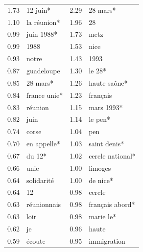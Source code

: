 \documentclass{article}
\begin{document}
\begin{table}[h]
\begin{tabular}{rlrl}
    \midrule
    1.73 & 12 juin*     & 2.29 & 28 mars* \\
    1.10 & la r\'{e}union* & 1.96 & 28 \\
    0.99 & juin 1988*   & 1.73 & metz \\
    0.99 & 1988         & 1.53 & nice \\
    0.93 & notre        & 1.43 & 1993 \\
    0.87 & guadeloupe   & 1.30 & le 28* \\
    0.85 & 28 mars*     & 1.26 & haute sa\^{o}ne* \\
    0.84 & france unie* & 1.23 & fran\c{c}ais \\
    0.83 & r\'{e}union  & 1.15 & mars 1993* \\
    0.82 & juin         & 1.14 & le pen* \\
    0.74 & corse        & 1.04 & pen \\
    0.70 & en appelle*  & 1.03 & saint denis* \\
    0.67 & du 12*       & 1.02 & cercle national* \\
    0.66 & unie         & 1.00 & limoges \\
    0.64 & solidarit\'{e} & 1.00 & de nice* \\
    0.64 & 12           & 0.98 & cercle \\
    0.63 & r\'{e}unionnais & 0.98 & fran\c{c}ais abord* \\
    0.63 & loir         & 0.98 & marie le* \\
    0.62 & je           & 0.96 & haute \\
    0.59 & \'{e}coute   & 0.95 & immigration \\
    \bottomrule
  \end{tabular}
\end{table}
\end{document}
